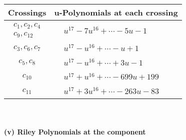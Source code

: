 \documentclass[1p]{elsarticle_modified}
\theoremstyle{definition}
\begin{document}
\begin{tabular}{m{50pt}|m{274pt}}
Crossings & \hspace{64pt}u-Polynomials at each crossing \\
\hline $$\begin{aligned}c_{1},c_{2},c_{4}\\c_{9},c_{12}\end{aligned}$$&$\begin{aligned}
&u^{17}-7 u^{16}+\cdots-5 u-1
\end{aligned}$\\
\hline $$\begin{aligned}c_{3},c_{6},c_{7}\end{aligned}$$&$\begin{aligned}
&u^{17}- u^{16}+\cdots- u+1
\end{aligned}$\\
\hline $$\begin{aligned}c_{5},c_{8}\end{aligned}$$&$\begin{aligned}
&u^{17}- u^{16}+\cdots+3 u-1
\end{aligned}$\\
\hline $$\begin{aligned}c_{10}\end{aligned}$$&$\begin{aligned}
&u^{17}+u^{16}+\cdots-699 u+199
\end{aligned}$\\
\hline $$\begin{aligned}c_{11}\end{aligned}$$&$\begin{aligned}
&u^{17}+3 u^{16}+\cdots-263 u-83
\end{aligned}$\\
\hline
\end{tabular}\\~\\
\newpage\renewcommand{\arraystretch}{1}
\flushleft \textbf{(v) Riley Polynomials at the component}\newline \\
\end{document}
